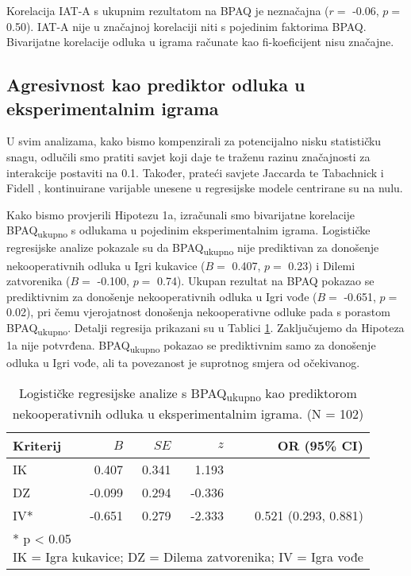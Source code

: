 \documentclass[a4paper, 12pt]{report}
\begin{document}
Korelacija IAT-A s ukupnim rezultatom na
BPAQ je neznačajna ($r =$ -0.06, $p =$ 0.50). IAT-A nije u značajnoj korelaciji
niti s pojedinim faktorima BPAQ.
Bivarijatne korelacije odluka u igrama računate
kao fi-koeficijent nisu značajne.

\subsection{Agresivnost kao prediktor odluka u eksperimentalnim igrama}

U svim analizama, kako bismo kompenzirali za potencijalno nisku statističku
snagu, odlučili smo pratiti savjet koji daje 
\citet{aguinis1995statistical} te traženu razinu značajnosti za interakcije
postaviti na 0.1. Također, prateći savjete Jaccarda
\citeyearpar{jaccard2001interaction} te Tabachnick i Fidell
\citeyearpar{tabachnick2012multi}, kontinuirane varijable unesene u regresijske
modele centrirane su na nulu. 

Kako bismo provjerili Hipotezu 1a, izračunali smo bivarijatne korelacije BPAQ\textsubscript{ukupno}
s odlukama u pojedinim eksperimentalnim igrama. Logističke regresijske analize
pokazale su da BPAQ\textsubscript{ukupno} nije prediktivan za donošenje
nekooperativnih odluka u
Igri kukavice ($B =$ 0.407, $p =$ 0.23) i Dilemi zatvorenika ($B =$ -0.100, $p
=$ 0.74). Ukupan rezultat na BPAQ pokazao se prediktivnim za donošenje
nekooperativnih odluka u Igri vođe ($B =$ -0.651, $p =$ 0.02), pri čemu
vjerojatnost donošenja nekooperativne odluke pada s porastom
BPAQ\textsubscript{ukupno}. Detalji regresija prikazani su u Tablici
\ref{bivargameks}. 
Zaključujemo da Hipoteza 1a nije potvrđena. BPAQ\textsubscript{ukupno} pokazao se prediktivnim
samo za donošenje odluka u Igri vođe, ali ta povezanost je suprotnog smjera od
očekivanog.

\begin{table}
    \begin{center}
        \caption{\label{bivargameks} Logističke regresijske analize s
            BPAQ\textsubscript{ukupno} kao prediktorom nekooperativnih odluka u
            eksperimentalnim igrama. (N = 102)}
        \hspace*{-0.7cm}\begin{tabular}{lrrrr}
        \toprule
        Kriterij & $B$ & $SE$ & $z$ & OR (95\% CI)\\
        \midrule
        IK & 0.407 & 0.341 & 1.193 &\\
        DZ & -0.099 & 0.294 & -0.336 &\\
        IV* & -0.651 & 0.279 & -2.333 & 0.521 (0.293, 0.881)\\
        \bottomrule
        \multicolumn{5}{l}{
            \parbox{9cm}{\scriptsize \vspace{3pt} 
                * p < 0.05\\
                IK = Igra kukavice; DZ = Dilema zatvorenika; IV = Igra vođe
        }}
    \end{tabular}
\end{center}
\end{table}
\end{document}
